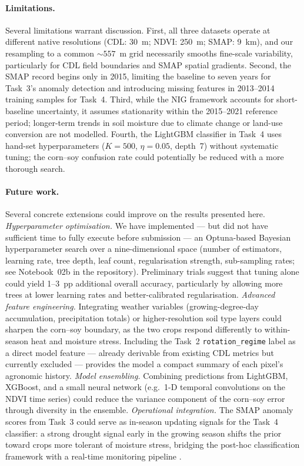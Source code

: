 \documentclass{article}
\begin{document}
\paragraph{Limitations.}
Several limitations warrant discussion.
First, all three datasets operate at different native resolutions
(CDL: 30~m; NDVI: 250~m; SMAP: 9~km), and our resampling to a
common ${\sim}557$~m grid necessarily smooths fine-scale variability,
particularly for CDL field boundaries and SMAP spatial gradients.
Second, the SMAP record begins only in 2015, limiting the baseline
to seven years for Task~3's anomaly detection and introducing missing
features in 2013--2014 training samples for Task~4.
Third, while the NIG framework accounts for short-baseline uncertainty,
it assumes stationarity within the 2015--2021 reference period;
longer-term trends in soil moisture due to climate change or land-use
conversion are not modelled.
Fourth, the LightGBM classifier in Task~4 uses hand-set hyperparameters
($K = 500$, $\eta = 0.05$, depth~7) without systematic tuning; the
corn--soy confusion rate could potentially be reduced with a more
thorough search.

\paragraph{Future work.}
Several concrete extensions could improve on the results presented here.
\emph{Hyperparameter optimisation.}
We have implemented --- but did not have sufficient time to fully execute
before submission --- an Optuna-based Bayesian hyperparameter search
over a nine-dimensional space (number of estimators, learning rate,
tree depth, leaf count, regularisation strength, sub-sampling rates;
see Notebook~02b in the repository).
Preliminary trials suggest that tuning alone could yield 1--3~pp
additional overall accuracy, particularly by allowing more trees at lower
learning rates and better-calibrated regularisation.
\emph{Advanced feature engineering.}
Integrating weather variables (growing-degree-day accumulation,
precipitation totals) or higher-resolution soil type layers could
sharpen the corn--soy boundary, as the two crops respond differently to
within-season heat and moisture stress.
Including the Task~2 \texttt{rotation\_regime} label as a direct model
feature --- already derivable from existing CDL metrics but currently
excluded --- provides the model a compact summary of each pixel's
agronomic history.
\emph{Model ensembling.}
Combining predictions from LightGBM, XGBoost, and a small neural
network (e.g.\ 1-D temporal convolutions on the NDVI time series)
could reduce the variance component of the corn--soy error through
diversity in the ensemble.
\emph{Operational integration.}
The SMAP anomaly scores from Task~3 could serve as in-season updating
signals for the Task~4 classifier: a strong drought signal early in the
growing season shifts the prior toward crops more tolerant of moisture
stress, bridging the post-hoc classification framework with a real-time
monitoring pipeline \citep{le2024smap_ndvi}.
\end{document}

